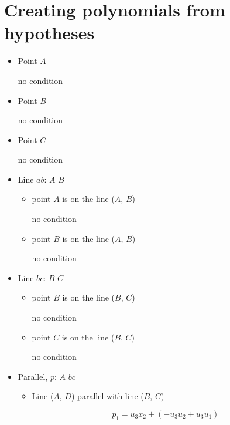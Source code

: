 \documentclass[a4paper]{article}
\begin{document}
\section{Creating polynomials from hypotheses}

\begin{itemize}

\item 

Point $A$ 


no condition\item 

Point $B$ 


no condition\item 

Point $C$ 


no condition\item 

Line $ab$: $A$ $B$ 
\begin{itemize}

\item 

point $A$ is on the line ($A$, $B$)


no condition\item 

point $B$ is on the line ($A$, $B$)


no condition\end{itemize}

\item 

Line $bc$: $B$ $C$ 
\begin{itemize}

\item 

point $B$ is on the line ($B$, $C$)


no condition\item 

point $C$ is on the line ($B$, $C$)


no condition\end{itemize}

\item 

Parallel, $p$: $A$ $bc$ 
\begin{itemize}

\item Line ($A$, $D$) parallel with line ($B$, $C$)

$$
p_{1}  =  u_{3}x_{2}+(-u_{3}u_{2}+u_{3}u_{1})
$$
\end{itemize}


\end{itemize}
\end{document}
